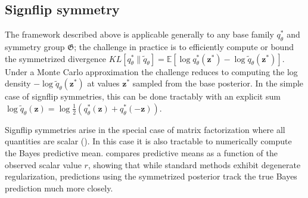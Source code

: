\documentclass{article}
\newcommand{\E}{\mathbb{E}}
\newcommand{\G}{\mathfrak{G}}
\renewcommand{\v}[1]{\mathbf{#1}}
\begin{document}
\subsection{Signflip symmetry}

The framework described above is applicable generally to any base
family $q^*_\theta$ and symmetry group $\G$; the challenge in practice is to efficiently
compute or bound the symmetrized divergence $KL[q^*_\theta \| \tilde{q}_\theta ] =
\E[\log q^*_\theta(\v{z}^*)-\log \tilde{q}_\theta(\v{z}^*)]$. Under a
Monte Carlo approximation the challenge reduces to computing the log
density $-\log \tilde{q}_\theta(\v{z}^*)$ at values $\v{z}^*$ sampled
from the base posterior. In the simple case of signflip symmetries,
this can be done tractably with an explicit sum $\log \tilde{q}_\theta(\v{z}) = \log \frac{1}{2}\left(q_\theta^*(\v{z}) + q_\theta^*(-\v{z})\right)$.

Signflip symmetries arise in the special case of matrix
factorization where all quantities are scalar
(). In this case it is also tractable to
numerically compute the Bayes predictive mean. 
compares predictive means as a function of the observed scalar value $r$, showing
that while standard methods exhibit degenerate regularization,
predictions using the symmetrized posterior track the true Bayes
prediction much more closely. 

\end{document}

